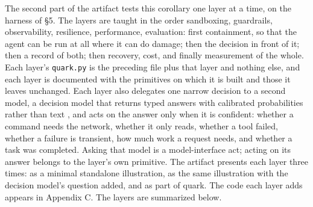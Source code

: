 The second part of the artifact tests this corollary one layer at a time, on the harness of §5. The layers are taught in the order sandboxing, guardrails, observability, resilience, performance, evaluation: first containment, so that the agent can be run at all where it can do damage; then the decision in front of it; then a record of both; then recovery, cost, and finally measurement of the whole. Each layer's \passthrough{\lstinline!quark.py!} is the preceding file plus that layer and nothing else, and each layer is documented with the primitives on which it is built and those it leaves unchanged. Each layer also delegates one narrow decision to a second model, a decision model that returns typed answers with calibrated probabilities rather than text \cite{typesafe}, and acts on the answer only when it is confident: whether a command needs the network, whether it only reads, whether a tool failed, whether a failure is transient, how much work a request needs, and whether a task was completed. Asking that model is a model-interface act; acting on its answer belongs to the layer's own primitive. The artifact presents each layer three times: as a minimal standalone illustration, as the same illustration with the decision model's question added, and as part of quark. The code each layer adds appears in Appendix C. The layers are summarized below.

